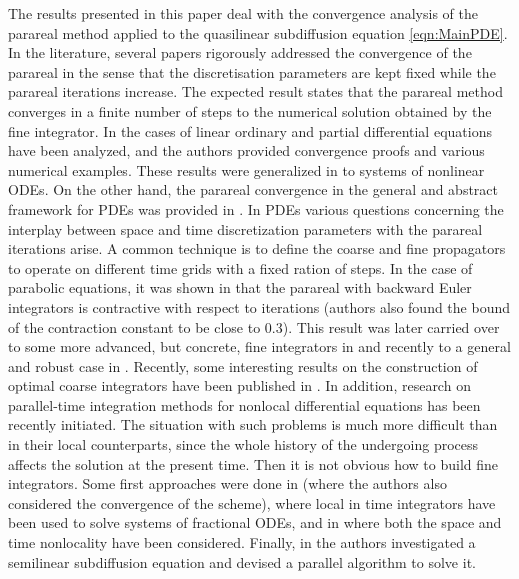 \documentclass[12pt,a4paper]{article}
\begin{document}
The results presented in this paper deal with the convergence analysis of the parareal method applied to the quasilinear subdiffusion equation \eqref{eqn:MainPDE}. In the literature, several papers rigorously addressed the convergence of the parareal in the sense that the discretisation parameters are kept fixed while the parareal iterations increase. The expected result states that the parareal method converges in a finite number of steps to the numerical solution obtained by the fine integrator. In \cite{gander2007analysis} the cases of linear ordinary and partial differential equations have been analyzed, and the authors provided convergence proofs and various numerical examples. These results were generalized in \cite{gander2008nonlinear} to systems of nonlinear ODEs. On the other hand, the parareal convergence in the general and abstract framework for PDEs was provided in \cite{bal2005convergence}. In PDEs various questions concerning the interplay between space and time discretization parameters with the parareal iterations arise. A common technique is to define the coarse and fine propagators to operate on different time grids with a fixed ration of steps. In the case of parabolic equations, it was shown in \cite{mathew2010analysis} that the parareal with backward Euler integrators is contractive with respect to iterations (authors also found the bound of the contraction constant to be close to $0.3$). This result was later carried over to some more advanced, but concrete, fine integrators in \cite{wu2015convergence} and recently to a general and robust case in \cite{yang2021robust}. Recently, some interesting results on the construction of optimal coarse integrators have been published in \cite{jin2025optimizing}. In addition, research on parallel-time integration methods for nonlocal differential equations has been recently initiated. The situation with such problems is much more difficult than in their local counterparts, since the whole history of the undergoing process affects the solution at the present time. Then it is not obvious how to build fine integrators. Some first approaches were done in \cite{xu2015parareal} (where the authors also considered the convergence of the scheme), \cite{wu2018parareal} where local in time integrators have been used to solve systems of fractional ODEs, and in \cite{fu2019preconditioned} where both the space and time nonlocality have been considered. Finally, in \cite{biala2018parallel} the authors investigated a semilinear subdiffusion equation and devised a parallel algorithm to solve it. 
\end{document}
